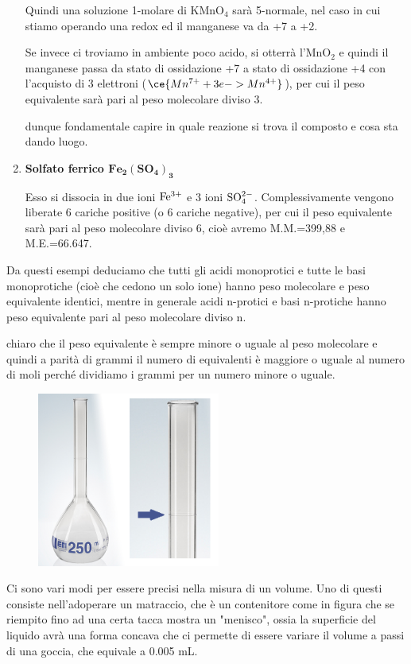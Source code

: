 \begin{enumerate}
    Quindi una soluzione 1-molare di KMnO$_4$ sarà 5-normale, nel caso in cui stiamo operando una redox ed il manganese va da +7 a +2. 
    
    \vspace{0.2cm}Se invece ci troviamo in ambiente poco acido, si otterrà l'MnO$_2$ e quindi il manganese passa da stato di ossidazione +7 a stato di ossidazione +4 con l'acquisto di 3 elettroni ($\ce{Mn^{7+} + 3e -> Mn^{4+}}$), per cui il peso equivalente sarà pari al peso molecolare diviso 3.

    \E dunque fondamentale capire in quale reazione si trova il composto e cosa sta dando luogo.

    \item \textbf{Solfato ferrico $\mathbf{Fe_2(SO_4)_3}$}

    Esso si dissocia in due ioni $\rm Fe^{3+}$ e 3 ioni $\rm SO_4^{2-}$. Complessivamente vengono liberate 6 cariche positive (o 6 cariche negative), per cui il peso equivalente sarà pari al peso molecolare diviso 6, cioè avremo M.M.=399,88 e M.E.=66.647.
\end{enumerate}

Da questi esempi deduciamo che tutti gli acidi monoprotici e tutte le basi monoprotiche (cioè che cedono un solo ione) hanno peso molecolare e peso equivalente identici, mentre in generale acidi n-protici e basi n-protiche hanno peso equivalente pari al peso molecolare diviso n.

\E chiaro che il peso equivalente è sempre minore o uguale al peso molecolare e quindi a parità di grammi il numero di equivalenti è maggiore o uguale al numero di moli perché dividiamo i grammi per un numero minore o uguale.

\hspace{1cm}\begin{minipage}{0.42\textwidth}
    \begin{figure}[H]
        \includegraphics[width=6cm]{immagini/matraccio.png}
    \end{figure}
\end{minipage}
\begin{minipage}{0.5\textwidth}
    Ci sono vari modi per essere precisi nella misura di un volume. Uno di questi consiste nell'adoperare un matraccio, che è un contenitore come in figura che se riempito fino ad una certa tacca mostra un "menisco", ossia la superficie del liquido avrà una forma concava che ci permette di essere variare il volume a passi di una goccia, che equivale a 0.005 mL.
\end{minipage}

